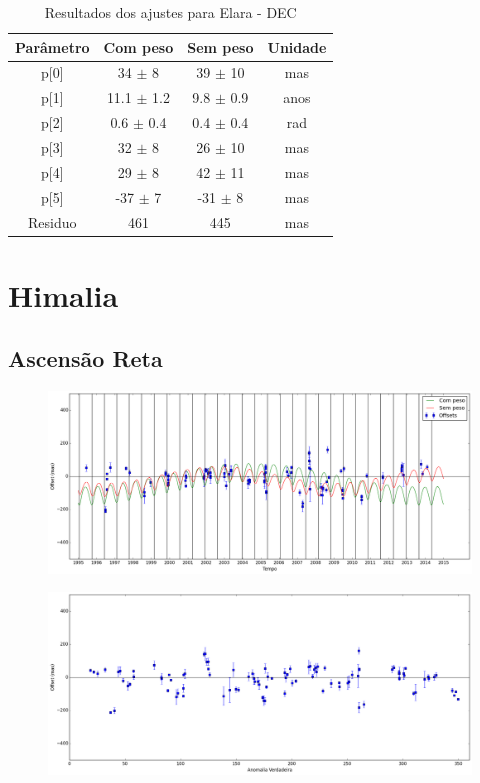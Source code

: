 \documentclass[11pt,a4paper]{report}
\begin{document}
\begin{table}[h!]
\caption{\label{Tab: Elara-DEC} Resultados dos ajustes para Elara - DEC}
\begin{centering}
\begin{tabular}{cccc}
\hline
\hline
Parâmetro & Com peso & Sem peso & Unidade\tabularnewline
\hline
p[0] & 34 $\pm$ 8 & 39 $\pm$ 10 & mas\\
p[1] & 11.1 $\pm$ 1.2 & 9.8 $\pm$ 0.9 & anos\\
p[2] & 0.6 $\pm$ 0.4 & 0.4 $\pm$ 0.4 & rad\\
p[3] & 32 $\pm$ 8 & 26 $\pm$ 10 & mas\\
p[4] & 29 $\pm$ 8 & 42 $\pm$ 11 & mas\\
p[5] & -37 $\pm$ 7 & -31 $\pm$ 8 & mas\\
Residuo & 461 & 445 & mas\\
\hline 
\end{tabular} 
\par\end{centering}
\end{table}

\chapter*{Himalia}
\section*{Ascensão Reta}

\begin{figure}[h]
\includegraphics[scale=0.35]{Himalia/RA.png} 
\end{figure}

\begin{figure}[h]
\includegraphics[scale=0.35]{Himalia/RA_anom.png}  
\end{figure}
\end{document}
